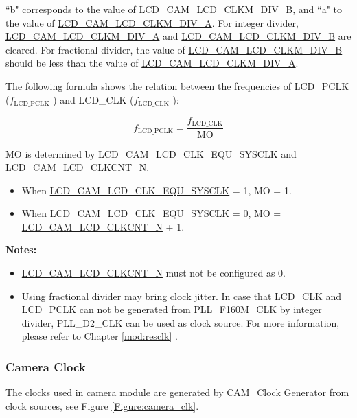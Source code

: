 \documentclass[main\_\_EN.tex]{subfiles}
\begin{document}
``b" corresponds to the value of  \hyperref[fielddesc:LCDCAMLCDCLKMDIVB]{LCD\_CAM\_LCD\_CLKM\_DIV\_B}, and ``a" to the value of  \hyperref[fielddesc:LCDCAMLCDCLKMDIVA]{LCD\_CAM\_LCD\_CLKM\_DIV\_A}. For integer divider, \hyperref[fielddesc:LCDCAMLCDCLKMDIVA]{LCD\_CAM\_LCD\_CLKM\_DIV\_A} and  \hyperref[fielddesc:LCDCAMLCDCLKMDIVB]{LCD\_CAM\_LCD\_CLKM\_DIV\_B} are cleared. For fractional divider, the value of \hyperref[fielddesc:LCDCAMLCDCLKMDIVB]{LCD\_CAM\_LCD\_CLKM\_DIV\_B} should be less than the value of  \hyperref[fielddesc:LCDCAMLCDCLKMDIVA]{LCD\_CAM\_LCD\_CLKM\_DIV\_A}.


The following formula shows the relation between the frequencies of LCD\_PCLK ($f_{\textrm{LCD\_PCLK}}$ ) and LCD\_CLK ($f_{\textrm{LCD\_CLK}}$ ):

$$f_{\textrm{LCD\_PCLK}} = \frac{f_{\textrm{LCD\_CLK}}}{\textrm{MO}}$$


MO is determined by  \hyperref[fielddesc:LCDCAMLCDCLKEQUSYSCLK]{LCD\_CAM\_LCD\_CLK\_EQU\_SYSCLK} and  \hyperref[fielddesc:LCDCAMLCDCLKCNTN]{LCD\_CAM\_LCD\_CLKCNT\_N}.

\begin{itemize}
    \item When  \hyperref[fielddesc:LCDCAMLCDCLKEQUSYSCLK]{LCD\_CAM\_LCD\_CLK\_EQU\_SYSCLK} = 1, MO = 1.
    \item When  \hyperref[fielddesc:LCDCAMLCDCLKEQUSYSCLK]{LCD\_CAM\_LCD\_CLK\_EQU\_SYSCLK} = 0, MO = \hyperref[fielddesc:LCDCAMLCDCLKCNTN]{LCD\_CAM\_LCD\_CLKCNT\_N} + 1.
\end{itemize}

{\bfseries Notes: }
\begin{itemize}
    \item \hyperref[fielddesc:LCDCAMLCDCLKCNTN]{LCD\_CAM\_LCD\_CLKCNT\_N} must not be configured as 0.
    \item Using fractional divider may bring clock jitter. In case that LCD\_CLK and LCD\_PCLK can not be generated from PLL\_F160M\_CLK by integer divider, PLL\_D2\_CLK can be used as clock source. For more information, please refer to Chapter \ref{mod:resclk} \textit{}.
\end{itemize}

\subsubsection{Camera Clock}

The clocks used in camera module are generated by CAM\_Clock Generator from clock sources, see Figure \ref{Figure:camera_clk}.
\end{document}
